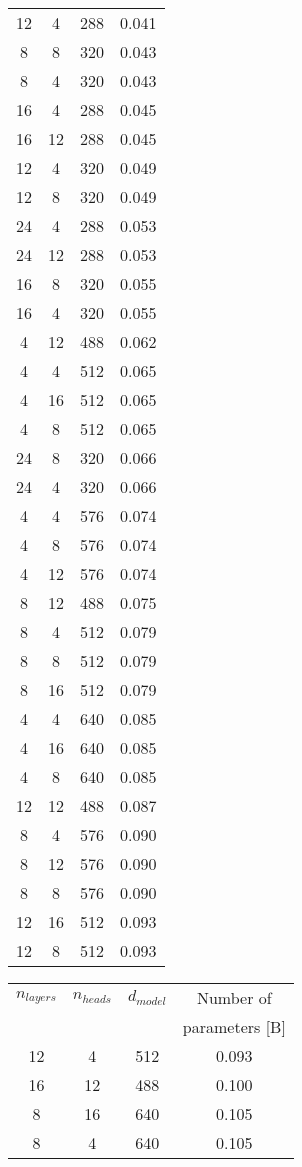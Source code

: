 \begin{table}[tp]
\begin{tabular}{cccc}
12 & 4 & 288 & 0.041\\
8 & 8 & 320 & 0.043\\
8 & 4 & 320 & 0.043\\
16 & 4 & 288 & 0.045\\
16 & 12 & 288 & 0.045\\
12 & 4 & 320 & 0.049\\
12 & 8 & 320 & 0.049\\
24 & 4 & 288 & 0.053\\
24 & 12 & 288 & 0.053\\
16 & 8 & 320 & 0.055\\
16 & 4 & 320 & 0.055\\
4 & 12 & 488 & 0.062\\
4 & 4 & 512 & 0.065\\
4 & 16 & 512 & 0.065\\
4 & 8 & 512 & 0.065\\
24 & 8 & 320 & 0.066\\
24 & 4 & 320 & 0.066\\
4 & 4 & 576 & 0.074\\
4 & 8 & 576 & 0.074\\
4 & 12 & 576 & 0.074\\
8 & 12 & 488 & 0.075\\
8 & 4 & 512 & 0.079\\
8 & 8 & 512 & 0.079\\
8 & 16 & 512 & 0.079\\
4 & 4 & 640 & 0.085\\
4 & 16 & 640 & 0.085\\
4 & 8 & 640 & 0.085\\
12 & 12 & 488 & 0.087\\
8 & 4 & 576 & 0.090\\
8 & 12 & 576 & 0.090\\
8 & 8 & 576 & 0.090\\
12 & 16 & 512 & 0.093\\
12 & 8 & 512 & 0.093\\\bottomrule
\end{tabular} 
\begin{tabular}{cccc}
\toprule
$n_{layers}$ & $n_{heads}$ & $d_{model}$ & Number of \\
 & & & parameters [B]\\
\midrule
12 & 4 & 512 & 0.093\\
16 & 12 & 488 & 0.100\\
8 & 16 & 640 & 0.105\\
8 & 4 & 640 & 0.105\\

\end{tabular}
\end{table}
